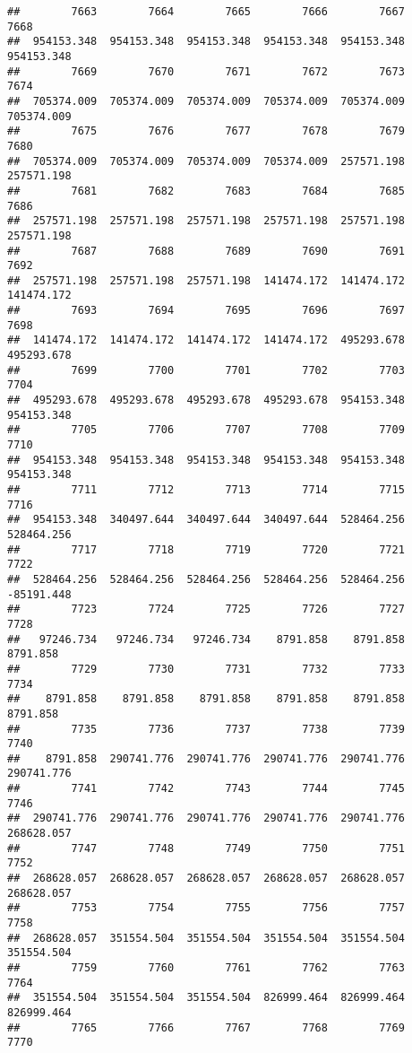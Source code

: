 \documentclass[
]{book}
\begin{document}
\begin{verbatim}
##        7663        7664        7665        7666        7667        7668 
##  954153.348  954153.348  954153.348  954153.348  954153.348  954153.348 
##        7669        7670        7671        7672        7673        7674 
##  705374.009  705374.009  705374.009  705374.009  705374.009  705374.009 
##        7675        7676        7677        7678        7679        7680 
##  705374.009  705374.009  705374.009  705374.009  257571.198  257571.198 
##        7681        7682        7683        7684        7685        7686 
##  257571.198  257571.198  257571.198  257571.198  257571.198  257571.198 
##        7687        7688        7689        7690        7691        7692 
##  257571.198  257571.198  257571.198  141474.172  141474.172  141474.172 
##        7693        7694        7695        7696        7697        7698 
##  141474.172  141474.172  141474.172  141474.172  495293.678  495293.678 
##        7699        7700        7701        7702        7703        7704 
##  495293.678  495293.678  495293.678  495293.678  954153.348  954153.348 
##        7705        7706        7707        7708        7709        7710 
##  954153.348  954153.348  954153.348  954153.348  954153.348  954153.348 
##        7711        7712        7713        7714        7715        7716 
##  954153.348  340497.644  340497.644  340497.644  528464.256  528464.256 
##        7717        7718        7719        7720        7721        7722 
##  528464.256  528464.256  528464.256  528464.256  528464.256  -85191.448 
##        7723        7724        7725        7726        7727        7728 
##   97246.734   97246.734   97246.734    8791.858    8791.858    8791.858 
##        7729        7730        7731        7732        7733        7734 
##    8791.858    8791.858    8791.858    8791.858    8791.858    8791.858 
##        7735        7736        7737        7738        7739        7740 
##    8791.858  290741.776  290741.776  290741.776  290741.776  290741.776 
##        7741        7742        7743        7744        7745        7746 
##  290741.776  290741.776  290741.776  290741.776  290741.776  268628.057 
##        7747        7748        7749        7750        7751        7752 
##  268628.057  268628.057  268628.057  268628.057  268628.057  268628.057 
##        7753        7754        7755        7756        7757        7758 
##  268628.057  351554.504  351554.504  351554.504  351554.504  351554.504 
##        7759        7760        7761        7762        7763        7764 
##  351554.504  351554.504  351554.504  826999.464  826999.464  826999.464 
##        7765        7766        7767        7768        7769        7770 

\end{verbatim}
\end{document}
